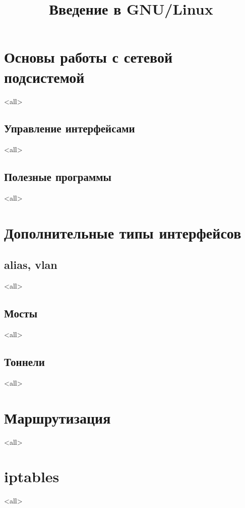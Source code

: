 

\title{Введение в GNU/Linux}








\begin{frame}
	\frametitle{}
	\titlepage
	\vspace{-0.5cm}
	\begin{center}
	\end{center}
\end{frame}



\section{Основы работы с сетевой подсистемой}

\mode<all>{}

\subsection{Управление интерфейсами}
\mode<all>{}

\subsection{Полезные программы}
\mode<all>{}

\section{Дополнительные типы интерфейсов}

\subsection{alias, vlan}
\mode<all>{}
\subsection{Мосты}
\mode<all>{}
\subsection{Тоннели}
\mode<all>{}

\section{Маршрутизация}
\mode<all>{}

\section{iptables}
\mode<all>{}



